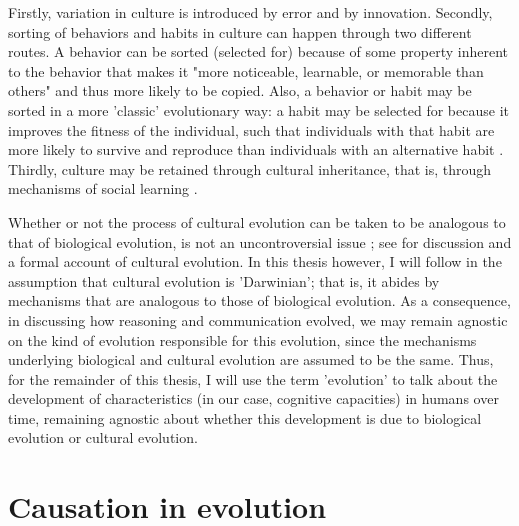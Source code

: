 Firstly, variation in culture is introduced by error and by innovation. 
Secondly, sorting of behaviors and habits in culture can happen through two different routes. A behavior can be sorted (selected for) because of some property inherent to the behavior that makes it "more noticeable, learnable, or memorable than others" \citep[p.~34]{Heyes18}  and thus more likely to be copied. Also, a behavior or habit may be sorted in a more 'classic' evolutionary way: a habit may be selected for because it improves the fitness of the individual, such that individuals with that habit are more likely to survive and reproduce than individuals with an alternative habit .
Thirdly, culture may be retained through cultural inheritance, that is, through mechanisms of social learning .

Whether or not the process of cultural evolution can be taken to be analogous to that of biological evolution, is not an uncontroversial issue ; see \citet{Claidiere14} for discussion and a formal account of cultural evolution.
In this thesis however, I will follow \citet{Heyes18} in the assumption that cultural evolution is 'Darwinian'; that is, it abides by mechanisms that are analogous to those of biological evolution.
As a consequence, in discussing how reasoning and communication evolved, we may remain agnostic on the kind of evolution responsible for this evolution, since the mechanisms underlying biological and cultural evolution are assumed to be the same.
Thus, for the remainder of this thesis, I will use the term 'evolution' to talk about the development of characteristics (in our case, cognitive capacities) in humans over time, remaining agnostic about whether this development is due to biological evolution or cultural evolution.


\section{Causation in evolution}
\label{sec:causation-evolution}

